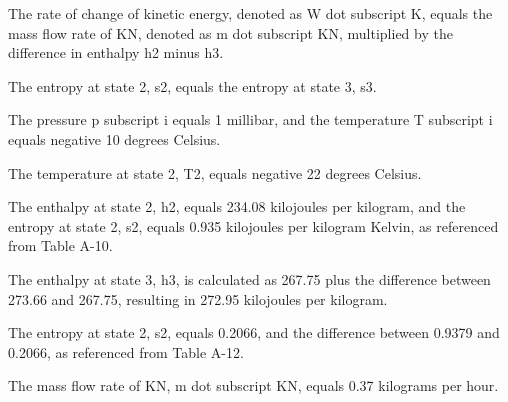 The rate of change of kinetic energy, denoted as W dot subscript K, equals the mass flow rate of KN, denoted as m dot subscript KN, multiplied by the difference in enthalpy h2 minus h3.

The entropy at state 2, s2, equals the entropy at state 3, s3.

The pressure p subscript i equals 1 millibar, and the temperature T subscript i equals negative 10 degrees Celsius.

The temperature at state 2, T2, equals negative 22 degrees Celsius.

The enthalpy at state 2, h2, equals 234.08 kilojoules per kilogram, and the entropy at state 2, s2, equals 0.935 kilojoules per kilogram Kelvin, as referenced from Table A-10.

The enthalpy at state 3, h3, is calculated as 267.75 plus the difference between 273.66 and 267.75, resulting in 272.95 kilojoules per kilogram.

The entropy at state 2, s2, equals 0.2066, and the difference between 0.9379 and 0.2066, as referenced from Table A-12.

The mass flow rate of KN, m dot subscript KN, equals 0.37 kilograms per hour.